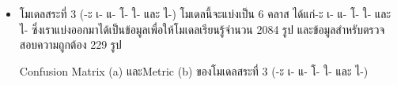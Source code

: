 \documentclass[12pt,oneside,openright,a4paper]{cpe-thai-project}
\begin{document}
\begin{itemize}
\begin{table}[!ht]
\begin{subtable}{.5\linewidth}
\begin{tabular}{ll|P{1cm}|P{1cm}|P{1cm}|P{1cm}|}
          \end{tabular}
        \end{subtable}
        \end{table}
        \newpage
         \item โมเดลสระที่ 3 (-ะ เ- แ- โ- ใ- และ ไ-)
         โมเดลนี้จะแบ่งเป็น 6 คลาส ได้แก่-ะ เ- แ- โ- ใ- และ ไ- ซึ่งเราแบ่งออกมาได้เป็นข้อมูลเพื่อให้โมเดลเรียนรู้จำนวน 2084 รูป และข้อมูลสำหรับตรวจสอบความถูกต้อง 229 รูป
         \begin{table}[!ht]
          \caption{Confusion Matrix (a) และMetric (b) ของโมเดลสระที่ 3 (-ะ เ- แ- โ- ใ- และ ไ-)}
          \begin{subtable}{.5\linewidth}  
          \centering
          \caption{}
         
          \begin{tabular}{ll|P{0.6cm}|P{0.6cm}|P{0.6cm}|P{0.6cm}|P{0.6cm}|P{0.6cm}|}
              

\end{tabular}
\end{subtable}
\end{table}
\end{itemize}
\end{document}
